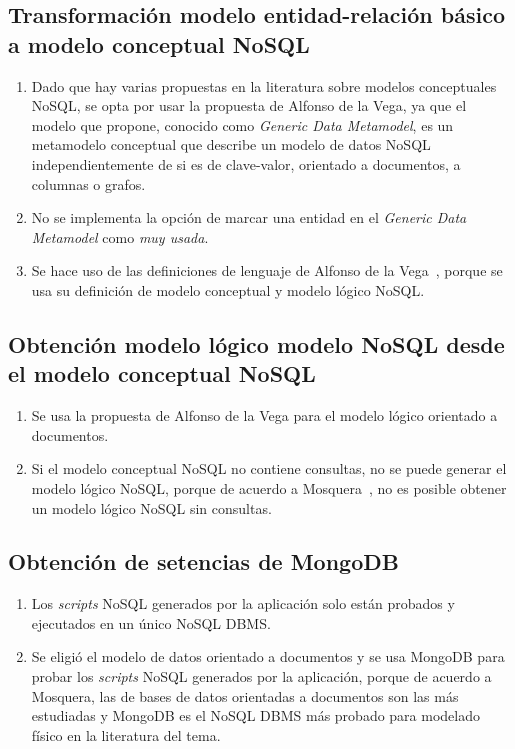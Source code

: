 \subsection*{Transformación modelo entidad-relación básico a modelo conceptual NoSQL}
\begin{enumerate}
    \item Dado que hay varias propuestas en la literatura sobre modelos conceptuales NoSQL, se opta por usar la propuesta de Alfonso de la Vega\cite{de_la_vega_mortadelo_2020}, ya que el modelo que propone, conocido como \textit{Generic Data Metamodel}, es un metamodelo conceptual que describe un modelo de datos NoSQL independientemente de si es de clave-valor, orientado a documentos, a columnas o grafos.
    \item No se implementa la opción de marcar una entidad en el \textit{Generic Data Metamodel} como \textit{muy usada}.
    \item Se hace uso de las definiciones de lenguaje de Alfonso de la Vega~\cite{de_la_vega_mortadelo_2020}, porque se usa su definición de modelo conceptual y modelo lógico NoSQL.
\end{enumerate}

\subsection*{Obtención modelo lógico modelo NoSQL desde el modelo conceptual NoSQL}
\begin{enumerate}
    \item Se usa la propuesta de Alfonso de la Vega\cite{de_la_vega_mortadelo_2020} para el modelo lógico orientado a documentos.
    \item Si el modelo conceptual NoSQL no contiene consultas, no se puede generar el modelo lógico NoSQL, porque de acuerdo a Mosquera~\cite{martinez-mosquera_modeling_2020}, no es posible obtener un modelo lógico NoSQL sin consultas.
\end{enumerate}

\subsection*{Obtención de setencias de MongoDB}
\begin{enumerate}
    \item Los \textit{scripts} NoSQL generados por la aplicación solo están probados y ejecutados en un único NoSQL DBMS.
    \item Se eligió el modelo de datos orientado a documentos y se usa MongoDB para probar los \textit{scripts} NoSQL generados por la aplicación, porque de acuerdo a Mosquera\cite{martinez-mosquera_modeling_2020}, las de bases de datos orientadas a documentos son las más estudiadas y MongoDB es el NoSQL DBMS más probado para modelado físico en la literatura del tema.
\end{enumerate}
    